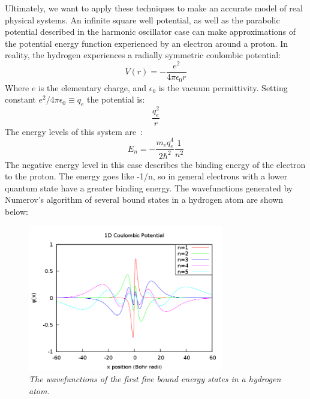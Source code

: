 \documentclass[aps,prl,twocolumn,superscriptaddress]{revtex4-1}
\begin{document}
Ultimately, we want to apply these techniques to make an accurate model of real physical systems. An infinite square well potential, as well as the parabolic potential described in the harmonic oscillator case can make approximations of the potential energy function experienced by an electron around a proton. In reality, the hydrogen experiences a radially symmetric coulombic potential:
\begin{equation}
 V(r) = -\frac{e^2}{4\pi\epsilon_0r}	\label{coulomb}
\end{equation}
Where $e$ is the elementary charge, and $\epsilon_0$ is the vacuum permittivity.  Setting constant $e^2/4\pi\epsilon_0 \equiv q_e$ the potential is:
\begin{equation}
 \frac{q_e^2}{r}	\label{coulomb2}
\end{equation}
The energy levels of this system are~\cite{code}:
\begin{equation}
 E_n = -\frac{m_eq_e^4}{2\hbar^2}\frac{1}{n^2}
\end{equation}The negative energy level in this case describes the binding energy of the electron to the proton. The energy goes like -1/n, so in general electrons with a lower quantum state have a greater binding energy. The wavefunctions generated by Numerov's algorithm of several bound states in a hydrogen atom are shown below: 
\begin{figure}[h!]
  \begin{center}
\centerline{\includegraphics[width=3.35in]{hydrogen.png}}
\caption{\it \small{The wavefunctions of the first five bound energy states in a hydrogen atom. \label{hydrogen}}}
  \end{center}
\end{figure}
\end{document}
